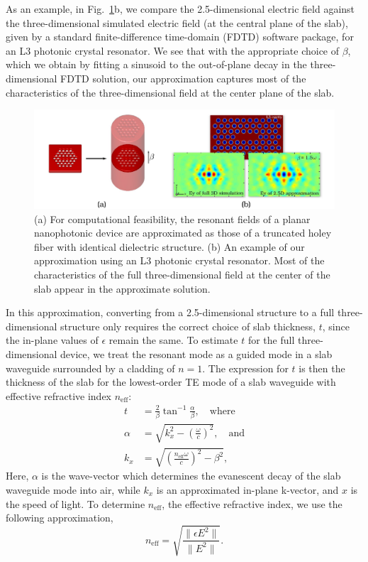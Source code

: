 As an example, in Fig.~\ref{approx}b, we compare the 2.5-dimensional electric field against the three-dimensional simulated electric field (at the central plane of the slab), given by a standard finite-difference time-domain (FDTD) software package, for an L3 photonic crystal resonator. We see that with the appropriate choice of $\beta$, which we obtain by fitting a sinusoid to the out-of-plane decay in the three-dimensional FDTD solution, our approximation captures most of the characteristics of the three-dimensional field at the center plane of the slab. 
\begin{figure}[hbt]
\centering\includegraphics[width=\textwidth]{p2/approx}
\caption{(a) For computational feasibility, the resonant fields of a planar nanophotonic device are approximated as those of a truncated holey fiber with identical dielectric structure. (b) An example of our approximation using an L3 photonic crystal resonator. Most of the characteristics of the full three-dimensional field at the center of the slab appear in the approximate solution.}\label{approx}
\end{figure}

In this approximation, converting from a 2.5-dimensional structure to a full three-dimensional structure only requires the correct choice of slab thickness, $t$, since the in-plane values of $\epsilon$ remain the same. To estimate $t$ for the full three-dimensional device, we treat the resonant mode as a guided mode in a slab waveguide surrounded by a cladding of $n=1$. The expression for $t$ is then the thickness of the slab for the lowest-order TE mode of a slab waveguide with effective refractive index $n_\text{eff}$\cite{Inan00}:
\begin{align}
t &= \frac{2}{\beta}\tan^{-1}\frac{\alpha}{\beta},\label{t} \quad\text{where} \\
\alpha &= \sqrt{k_x^2 - \left(\frac{\omega}{c}\right)^2}, \quad\text{and} \\
k_x &= \sqrt{\left(\frac{n_\text{eff}\omega}{c}\right)^2 - \beta^2},
\end{align}
Here, $\alpha$ is the wave-vector which determines the evanescent decay of the slab waveguide mode into air, while $k_x$ is an approximated in-plane k-vector, and $x$ is the speed of light. To determine $n_\text{eff}$, the effective refractive index, we use the following approximation,
\begin{equation}
n_\text{eff} = \sqrt{\frac{\|\epsilon E^2\|}{\|E^2\|}}.
\end{equation}


